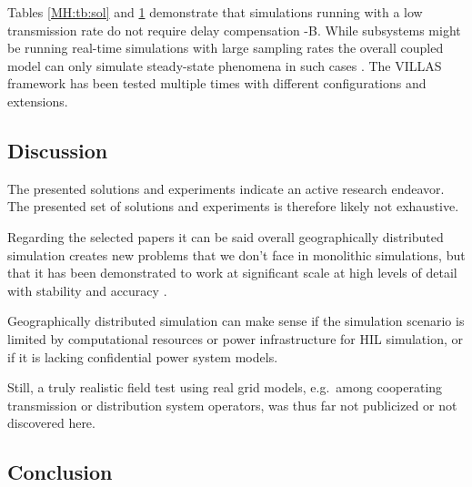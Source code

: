 \documentclass[a4paper,ngerman]{atseminar}
\begin{document}
\begin{table}[h]
{\begin{tabular}{ll|lllllll}

\end{tabular}
\label{MH:tb:exp}
}%
\end{table}

Tables \ref{MH:tb:sol} and \ref{MH:tb:exp} demonstrate that simulations running with a low transmission rate do not require delay compensation \cite{palmintier2015, lundstrom2017} \cite{pellegrino2020}-B. While subsystems might be running real-time simulations with large sampling rates the overall coupled model can only simulate steady-state phenomena in such cases \cite{palmintier2015}. The VILLAS framework has been tested multiple times with different configurations and extensions.


\subsection{Discussion}
\label{MH:sec:discuss}


The presented solutions and experiments indicate an active research endeavor. The presented set of solutions and experiments is therefore likely not exhaustive.

Regarding the selected papers it can be said overall geographically distributed simulation creates new problems that we don't face in monolithic simulations, but that it has been demonstrated to work at significant scale at high levels of detail with stability and accuracy \cite{monti2018}.

Geographically distributed simulation can make sense if the simulation scenario is limited by computational resources or power infrastructure for HIL simulation, or if it is lacking confidential power system models.

Still, a truly realistic field test using real grid models, e.g.~among cooperating transmission or distribution system operators, was thus far not publicized or not discovered here.


\subsection{Conclusion}
\end{document}
